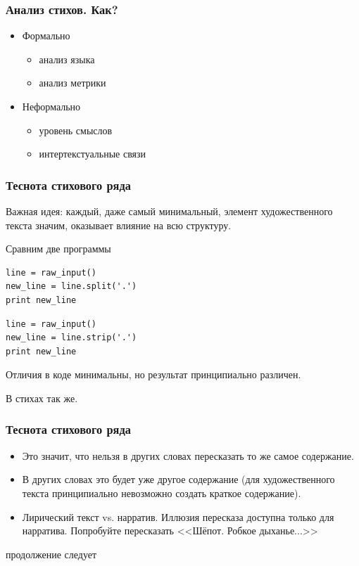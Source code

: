 \documentclass{beamer}
\begin{document}

\begin{frame}
\frametitle{Анализ стихов. Как?}


\begin{itemize}
\item Формально
\begin{itemize}
\item анализ языка
\item анализ метрики
\end{itemize} 
\item Неформально
\begin{itemize}
\item уровень смыслов
\item интертекстуальные связи
\end{itemize} 
\end{itemize}

\end{frame}


\begin{frame}[fragile]
\frametitle{Теснота стихового ряда}

Важная идея: каждый, даже самый минимальный, элемент художественного текста значим, оказывает влияние на всю структуру.

Сравним две программы

\begin{verbatim} 
line = raw_input()
new_line = line.split('.')
print new_line
\end{verbatim}

\begin{verbatim} 
line = raw_input()
new_line = line.strip('.')
print new_line
\end{verbatim}

Отличия в коде минимальны, но результат принципиально различен.

В стихах так же.

\end{frame}




\begin{frame}
\frametitle{Теснота стихового ряда}

\begin{itemize}
\item Это значит, что нельзя в других словах пересказать то же самое содержание.
\item В других словах это будет уже другое содержание (для художественного текста принципиально невозможно создать краткое содержание).
\item Лирический текст vs. нарратив. Иллюзия пересказа доступна только для нарратива. Попробуйте пересказать <<Шёпот. Робкое дыханье...>>
\end{itemize}



\end{frame}



\begin{frame}
\Huge{\centerline{продолжение следует}}
\end{frame}

\end{document}
